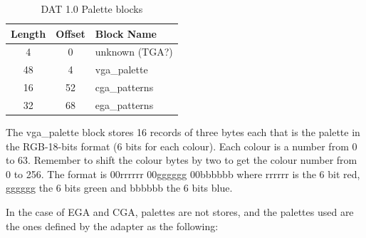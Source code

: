 \documentclass{article}
\begin{document}
\begin{table}
\begin{tabular}{ccl}
\hline
  Length & Offset & Block Name \\
\hline
  4     & 0      & unknown (TGA?) \\
  48    & 4      & vga\_palette \\
  16    & 52     & cga\_patterns \\
  32    & 68     & ega\_patterns \\
\hline
\end{tabular}
\caption{DAT 1.0 Palette blocks}
\label{palettes table}
\end{table}

 The vga\_palette block stores 16 records of three bytes each that is the
 palette in the RGB-18-bits format (6 bits for each colour). Each colour is
 a number from 0 to 63. Remember to shift the colour bytes by two to get
 the colour number from 0 to 256. The format is 00rrrrrr 00gggggg 00bbbbbb
 where rrrrrr is the 6 bit red, gggggg the 6 bits green and bbbbbb the 6
 bits blue.
 
 In the case of EGA and CGA, palettes are not stores, and the palettes used
 are the ones defined by the adapter as the following:
 
\end{document}
